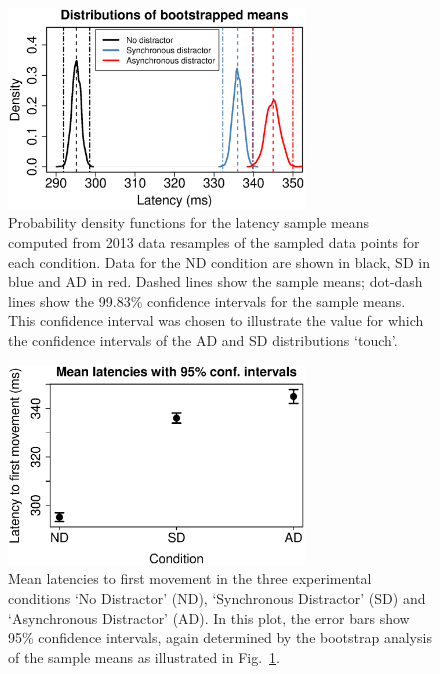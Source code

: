 \documentclass[10pt,letterpaper]{article}
\begin{document}
\begin{figure}[htb!]
\centering
\includegraphics[width=0.7\textwidth]{./figures/bootstrapped_means.eps}
\caption[Bootstrapped PDFS] {Probability density functions for the
  latency sample means computed from 2013 data resamples of the
  sampled data points for each condition. Data for the ND condition
  are shown in black, SD in blue and AD in red. Dashed lines show the
  sample means; dot-dash lines show the 99.83\% confidence intervals
  for the sample means. This confidence interval was
  chosen to illustrate the value for which the confidence intervals of
  the AD and SD distributions `touch'.}
\label{bootstrapmean}
\end{figure}

\begin{figure}[htb!]
\centering
\includegraphics[width=0.7\textwidth]{./figures/meanmad.eps}
\caption[Mean latencies] {Mean latencies to first movement in the
  three experimental conditions `No Distractor' (ND), `Synchronous
  Distractor' (SD) and `Asynchronous Distractor' (AD). In this plot,
  the error bars show 95\% confidence intervals, again determined by
  the bootstrap analysis of the sample means as illustrated in
  Fig.~\ref{bootstrapmean}.}
\label{meanmad}
\end{figure}
\end{document}
